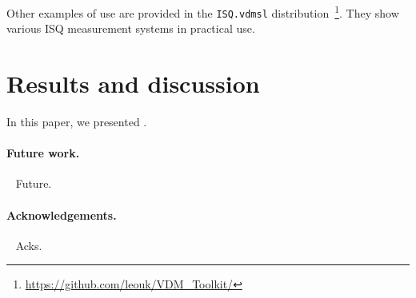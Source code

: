 \documentclass[runningheads,a4paper]{llncs}
\begin{document}
Other examples of use are provided in the \texttt{ISQ.vdmsl} distribution~\footnote{\url{https://github.com/leouk/VDM_Toolkit/}}. They show various ISQ measurement systems in practical use.

\section{Results and discussion}\label{sec:Results}

In this paper, we presented .

\paragraph*{Future work.}~
%
Future.

\paragraph*{Acknowledgements.}~
%
Acks.


%


\end{document}

